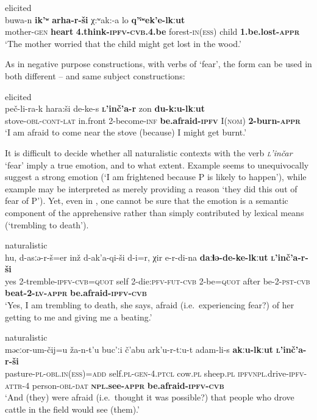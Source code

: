 \documentclass[output=paper,colorlinks,citecolor=brown]{langscibook}
\begin{document}
\ea \label{ex:DD23} \textnormal{elicited} \\
\gll buwa-n \textbf{ik'ʷ} \textbf{arha-r-ši} χ:ʷak:-a lo \textbf{q'ˤʷek'e-lkːut} \\
mother-\textsc{gen} \textbf{heart} \textbf{4.think-\textsc{ipfv-cvb}.4.be} forest-\textsc{in(ess)} child \textbf{1.be.lost-\textsc{appr}} \\
\glt `The mother worried that the child might get lost in the wood.' 
\z


\noindent As in negative purpose constructions, with verbs of `fear', the form can be used in both different -- and same  subject constructions:


\ea \label{ex:DD24} \textnormal{elicited} \\
\gll peč-li-ra-k hara:ši de-ke-s \textbf{\textsc{l}'inč'a-r} zon \textbf{du-k:u-lkːut} \\
stove-\textsc{obl-cont-lat} in.front 2-become-\textsc{inf} \textbf{be.afraid-\textsc{ipfv}} I(\textsc{nom}) \textbf{2-burn-\textsc{appr}} \\
\glt `I am afraid to come near the stove (because) I might get burnt.'
\z


 It is difficult to decide whether all naturalistic contexts with the verb \textit{\textsc{l}'inčar} `fear' imply a true emotion, and to what extent. Example  seems to unequivocally suggest a strong emotion (`I am frightened because P is likely to happen'), while example  may be interpreted as merely providing a reason `they did this out of fear of P'). Yet, even in , one cannot be sure that the emotion is a semantic component of the apprehensive rather than simply contributed by lexical means (`trembling to death').


\ea \label{ex:DD25} \textnormal{naturalistic} \\
\gll hu, d-asːə-r-š=er inž d-ak'a-qi-ši d-i=r, χir e-r-di-na \textbf{daːɬə-de-ke-lkːut} \textbf{\textsc{l}'inč'a-r-ši} \\
yes 2-tremble-\textsc{ipfv-cvb=quot} self 2-die:\textsc{pfv-fut-cvb} 2-be=\textsc{quot} after be-2-\textsc{pst-cvb} \textbf{beat-2-\textsc{lv-appr}} \textbf{be.afraid-\textsc{ipfv-cvb}} \\
\glt `Yes, I am trembling to death, she says, afraid (i.e.\   experiencing fear?) of her getting to me and giving me a beating.'
\z

\newpage
\ea \label{ex:DD26} \textnormal{naturalistic} \\
\gll məcːor-um-čij=u ža-n-t'u buc'ːi č'abu a{\textlangle}r{\textrangle}k'u-r-tːu-t adam-li-s \textbf{akːu-lkːut} \textbf{\textsc{l}'inč'a-r-ši} \\
pasture-\textsc{pl-obl.in(ess)=add} self\textsc{.pl-gen-4.ptcl} cow.\textsc{pl} sheep.\textsc{pl} {\textlangle}\textsc{ipfv}{\textrangle}\textsc{npl}.drive-\textsc{ipfv-attr}-4 person-\textsc{obl-dat} \textbf{\textsc{npl}.see-\textsc{appr}} \textbf{be.afraid-\textsc{ipfv-cvb}}  \\
\glt `And (they) were afraid (i.e.\   thought it was possible?) that people who drove cattle in the field would see (them).'
\z
\end{document}
